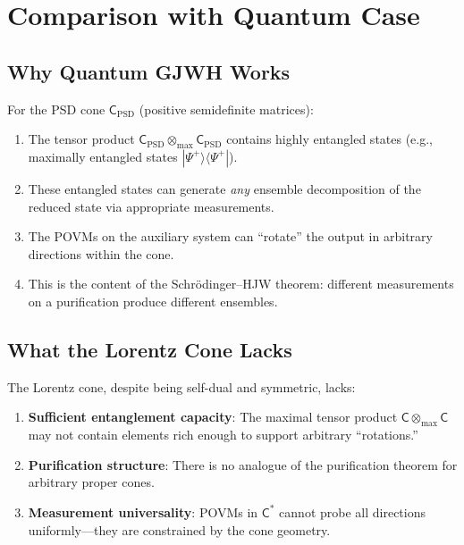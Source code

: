 \documentclass[11pt,a4paper]{article}
\theoremstyle{definition}
\newcommand{\C}{\mathsf{C}}
\newcommand{\tmax}{\otimes_{\max}}
\begin{document}
\section{Comparison with Quantum Case}

\subsection{Why Quantum GJWH Works}

For the PSD cone $\C_{\text{PSD}}$ (positive semidefinite matrices):

\begin{enumerate}
    \item The tensor product $\C_{\text{PSD}} \tmax \C_{\text{PSD}}$ contains highly entangled states (e.g., maximally entangled states $|\Psi^+\rangle\langle\Psi^+|$).

    \item These entangled states can generate \emph{any} ensemble decomposition of the reduced state via appropriate measurements.

    \item The POVMs on the auxiliary system can ``rotate'' the output in arbitrary directions within the cone.

    \item This is the content of the Schr\"odinger--HJW theorem: different measurements on a purification produce different ensembles.
\end{enumerate}

\subsection{What the Lorentz Cone Lacks}

The Lorentz cone, despite being self-dual and symmetric, lacks:

\begin{enumerate}
    \item \textbf{Sufficient entanglement capacity}: The maximal tensor product $\C \tmax \C$ may not contain elements rich enough to support arbitrary ``rotations.''

    \item \textbf{Purification structure}: There is no analogue of the purification theorem for arbitrary proper cones.

    \item \textbf{Measurement universality}: POVMs in $\C^*$ cannot probe all directions uniformly---they are constrained by the cone geometry.
\end{enumerate}
\end{document}
